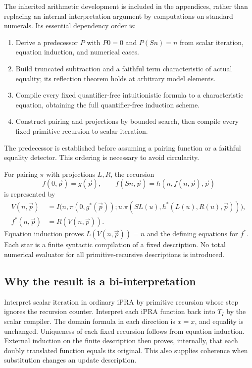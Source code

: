 \documentclass[11pt]{article}
\theoremstyle{definition}
\begin{document}
The inherited arithmetic development is included in the appendices, rather
than replacing an internal interpretation argument by computations on
standard numerals. Its essential dependency order is:
\begin{enumerate}
\item Derive a predecessor $P$ with $P0=0$ and $P(Sn)=n$ from scalar
iteration, equation induction, and numerical cases.
\item Build truncated subtraction and a faithful term characteristic of
actual equality; its reflection theorem holds at arbitrary model elements.
\item Compile every fixed quantifier-free intuitionistic formula to a
characteristic equation, obtaining the full quantifier-free induction scheme.
\item Construct pairing and projections by bounded search, then compile
every fixed primitive recursion to scalar iteration.
\end{enumerate}
The predecessor is established before assuming a pairing function or a
faithful equality detector. This ordering is necessary to avoid circularity.

For pairing $\pi$ with projections $L,R$, the recursion
\[
f(0,\vec p)=g(\vec p),\qquad
f(Sn,\vec p)=h(n,f(n,\vec p),\vec p)
\]
is represented by
\[
\begin{split}
 V(n,\vec p)&=I\bigl(n,\pi(0,g^*(\vec p));
 u.\pi(SL(u),h^*(L(u),R(u),\vec p))\bigr),\\
 f^*(n,\vec p)&=R(V(n,\vec p)).
\end{split}
\]
Equation induction proves $L(V(n,\vec p))=n$ and the defining
equations for $f^*$. Each star is a finite syntactic compilation of a
fixed description. No total numerical evaluator for all primitive-recursive
descriptions is introduced.

\subsection{Why the result is a bi-interpretation}

Interpret scalar iteration in ordinary iPRA by primitive recursion whose
step ignores the recursion counter. Interpret each iPRA function back into
$T_I$ by the scalar compiler. The domain formula in each direction is
$x=x$, and equality is unchanged. Uniqueness of each fixed recursion follows
from equation induction. External induction on the finite description then
proves, internally, that each doubly translated function equals its original.
This also supplies coherence when substitution changes an update description.
\end{document}
